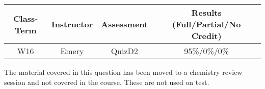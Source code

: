 \begin{outcomes}
	\begin{center}
		\begin{tabular}{cccc}
			\hline\hline
                Class-Term & Instructor & Assessment & Results (Full/Partial/No Credit) \\
			\hline
                W16 & Emery & QuizD2 & 95\%/0\%/0\%\\
			\hline
		\end{tabular}
	\end{center}
\end{outcomes}

\begin{comments}

The material covered in this question has been moved to a chemistry review session and not covered in the course. These are not used on test.
	
\end{comments}
